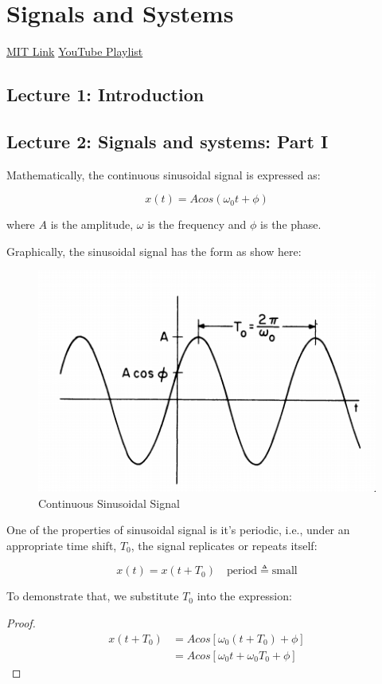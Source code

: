 \documentclass[fleqn,10pt]{olplainarticle}
\theoremstyle{definition}
\theoremstyle{remark}
\begin{document}
\pagebreak

\section*{Signals and Systems}

\href{https://ocw.mit.edu/resources/res-6-007-signals-and-systems-spring-2011/}{MIT Link}
\href{https://www.youtube.com/playlist?list=PL41692B571DD0AF9B}{YouTube Playlist}

\subsection*{Lecture 1: Introduction}

\pagebreak

\subsection*{Lecture 2: Signals and systems: Part I}

Mathematically, the continuous sinusoidal signal is expressed as:

$$x(t) = A cos (\omega_0 t + \phi)$$

where $A$ is the amplitude, $\omega$ is the frequency and $\phi$ is the phase.

Graphically, the sinusoidal signal has the form as show here:

\begin{figure}[ht]
\centering
\includegraphics[width=0.5\linewidth]{images/signals_01.png}
\caption{Continuous Sinusoidal Signal}
\label{fig:signals_01}
\end{figure}

One of the properties of sinusoidal signal is it's periodic, i.e., under an appropriate time shift, $T_0$, the signal replicates or repeats itself:

$$x(t) = x(t + T_0) \quad \text{period} \triangleq \text{small}$$

To demonstrate that, we substitute $T_0$ into the expression:

\begin{proof}
$$
\begin{aligned}
x(t + T_0)
& = A cos [\omega_0 (t + T_0) + \phi] \\
& = A cos [\omega_0 t + \omega_0 T_0 + \phi]
\end{aligned}
$$
\end{proof}
\end{document}
